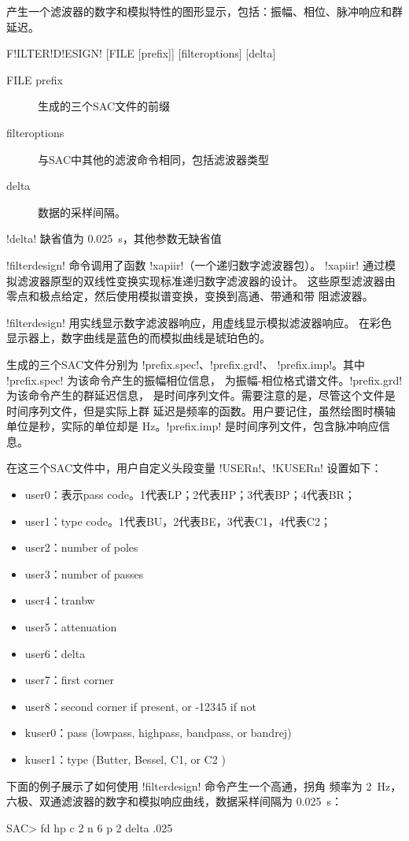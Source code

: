 \label{cmd:filterdesign}

产生一个滤波器的数字和模拟特性的图形显示，包括：振幅、相位、脉冲响应和群延迟。

\begin{SACSTX}
F!ILTER!D!ESIGN! [FILE [prefix]] [filteroptions] [delta]
\end{SACSTX}

\begin{description}
\item [FILE prefix] 生成的三个SAC文件的前缀
\item [filteroptions] 与SAC中其他的滤波命令相同，包括滤波器类型
\item [delta] 数据的采样间隔。
\end{description}

!delta! 缺省值为 \SI{0.025}{\s}，其他参数无缺省值

!filterdesign! 命令调用了函数 !xapiir!（一个递归数字滤波器包）。
!xapiir! 通过模拟滤波器原型的双线性变换实现标准递归数字滤波器的设计。
这些原型滤波器由零点和极点给定，然后使用模拟谱变换，变换到高通、带通和带
阻滤波器。

!filterdesign! 用实线显示数字滤波器响应，用虚线显示模拟滤波器响应。
在彩色显示器上，数字曲线是蓝色的而模拟曲线是琥珀色的。

生成的三个SAC文件分别为 !prefix.spec!、!prefix.grd!、
!prefix.imp!。其中 !prefix.spec! 为该命令产生的振幅相位信息，
为振幅-相位格式谱文件。!prefix.grd! 为该命令产生的群延迟信息，
是时间序列文件。需要注意的是，尽管这个文件是时间序列文件，但是实际上群
延迟是频率的函数。用户要记住，虽然绘图时横轴单位是秒，实际的单位却是
\si{\Hz}。!prefix.imp! 是时间序列文件，包含脉冲响应信息。

在这三个SAC文件中，用户自定义头段变量 !USERn!、!KUSERn! 设置如下：
\begin{itemize}
\item user0：表示pass code。1代表LP；2代表HP；3代表BP；4代表BR；
\item user1：type code。1代表BU，2代表BE，3代表C1，4代表C2；
\item user2：number of poles
\item user3：number of passes
\item user4：tranbw
\item user5：attenuation
\item user6：delta
\item user7：first corner
\item user8：second corner if present, or -12345 if not
\item kuser0：pass (lowpass, highpass, bandpass, or bandrej)
\item kuser1：type (Butter, Bessel, C1, or C2 )
\end{itemize}

下面的例子展示了如何使用 !filterdesign! 命令产生一个高通，拐角
频率为 \SI{2}{\Hz}，六极、双通滤波器的数字和模拟响应曲线，数据采样间隔为
\SI{0.025}{\s}：
\begin{SACCode}
SAC> fd hp c 2 n 6 p 2 delta .025
\end{SACCode}
